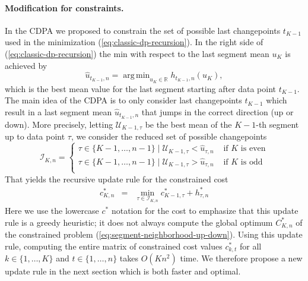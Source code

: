 \documentclass[twoside,11pt]{article}
\DeclareMathOperator*{\argmin}{arg\,min}
\newcommand{\RR}{\mathbb R}
\begin{document}
\paragraph{Modification for constraints.} In the CDPA we proposed to
constrain the set of possible last changepoints $t_{K-1}$ used in the
minimization (\ref{eq:classic-dp-recursion}). In the right side of
(\ref{eq:classic-dp-recursion}) the min with respect to the last
segment mean $u_K$ is achieved by
\begin{equation}
  \hat u_{t_{K-1},n}=\argmin_{u_K\in\RR} h_{t_{K-1},n}(u_K),
\end{equation}
which is the best mean value for the last segment starting after data
point $t_{K-1}$. The main idea of the CDPA is to only consider last
changepoints $t_{K-1}$ which result in a last segment mean
$\hat u_{t_{K-1},n}$ that jumps in the correct direction (up or
down). More precisely, letting $\mathcal U_{K-1,\tau}$ be the best
mean of the $K-1$-th segment up to data point $\tau$, we consider the
reduced set of possible changepoints
\begin{equation}
\mathcal I_{K,n} = \begin{cases}
\tau\in\{K-1, \dots, n-1\}\mid \mathcal U_{K-1,\tau}< \hat u_{\tau,n} &\text{ if $K$ is even}\\
\tau\in\{K-1, \dots, n-1\}\mid \mathcal U_{K-1,\tau}> \hat u_{\tau,n} &\text{ if $K$ is odd}\\
\end{cases}
\end{equation}
That yields the recursive update rule for the constrained  cost 
\begin{eqnarray}
\label{eq:dp-recursion-constrained}
c^*_{K,n} &=& \min_{\tau\in\mathcal I_{K,n}} 
c^*_{K-1,\tau} + h^*_{\tau, n}
\end{eqnarray}
Here we use the lowercase $c^*$ notation for the cost to emphasize that this update
rule is a greedy heuristic; it does not always compute the global optimum  $C^*_{K,n}$ of the constrained problem
(\ref{eq:segment-neighborhood-up-down}). Using this update rule, computing the entire matrix of constrained
cost values $c^*_{k,t}$ for all $k\in\{1,\dots, K\}$
and $t\in\{1,\dots,n\}$ takes $O(Kn^2)$ time. We therefore propose a new
update rule in the next section which is both faster and optimal.
\end{document}
